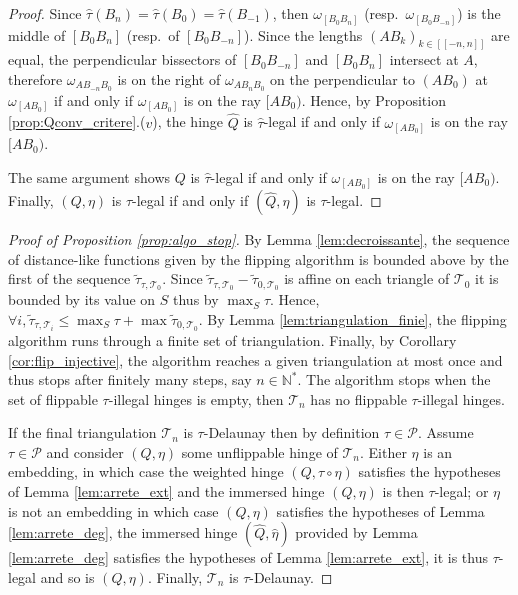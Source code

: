 \documentclass[a4paper,12pt]{article}
\def\NN{\mathbb N}
\def\lsem{[\![}
\def\rsem{]\!]}
\def\TT{\mathcal T}
\def\adm{\P}
\def\adm{\mathcal{P}}
\def\P{\mathcal{P}}
\newcommand{\tautilde}[2]{\widetilde\tau_{#1,#2}}
\theoremstyle{definition}
\begin{document}
\begin{proof}
						Since $\hat\tau(B_n)=\hat\tau(B_0)=\hat\tau(B_{-1})$, then $\omega_{[B_0B_n]}$ (resp.\ $\omega_{[B_0B_{-n}]}$) is the middle of $[B_0B_n]$ (resp.\ of $[B_0B_{-n}]$). Since the lengths $(AB_k)_{k\in \lsem -n,n\rsem}$ are equal, the perpendicular bissectors of $[B_0B_{-n}]$ and $[B_0B_{n}]$ intersect at $A$, therefore $\omega_{AB_{-n}B_0}$ is on the right of $\omega_{AB_{n}B_0}$ on the perpendicular to $(AB_0)$ at $\omega_{[AB_0]}$ if and only if $\omega_{[AB_0]}$
						 is on the ray $[AB_0)$. Hence, by Proposition \ref{prop:Qconv_critere}.($v$), the hinge $\hat Q$ is $\hat\tau$-legal if and only if $\omega_{[AB_0]}$ is on the ray $[AB_0)$.
						
						The same argument shows $Q$ is $\hat\tau$-legal if and only if $\omega_{[AB_0]}$ is on the ray $[AB_0)$. Finally, 
						$(Q,\eta)$ is $\tau$-legal if and only if $(\hat Q,\hat \eta)$ is $\tau$-legal.\end{proof}
						\begin{proof}[Proof of Proposition \ref{prop:algo_stop}]
							By Lemma \ref{lem:decroissante}, the sequence of distance-like functions given by the flipping algorithm is bounded above by the first of the sequence $\tautilde{\tau}{\TT_0}$. Since $\tautilde{\tau}{\TT_0}-\tautilde{0}{\TT_0}$ is affine on each triangle of $\TT_0$ it is bounded by its value on $S$ thus by $\max_S \tau$. 
							Hence, $\forall i,\tautilde{\tau}{\TT_i}\leq \max_S{\tau}+\max\tautilde{0}{\TT_0}$.
							By Lemma \ref{lem:triangulation_finie}, the flipping algorithm runs through a finite set of triangulation. Finally, by Corollary \ref{cor:flip_injective}, the algorithm reaches a given triangulation at most once and thus stops after finitely many steps, say $n\in \NN^*$. The algorithm stops when the set of flippable $\tau$-illegal hinges is empty, then $\TT_n$ has no flippable $\tau$-illegal hinges.
							
							If the final triangulation $\TT_n$ is $\tau$-Delaunay then by definition $\tau\in \adm$. Assume $\tau \in \adm$ and consider $(Q,\eta)$ some unflippable hinge of $\TT_n$. Either $\eta$ is an embedding, in which case the weighted hinge $(Q,\tau\circ \eta)$ satisfies the hypotheses of Lemma \ref{lem:arrete_ext} and the immersed hinge $(Q,\eta)$ is then $\tau$-legal; or $\eta$ is not an embedding in which case $(Q,\eta)$ satisfies the hypotheses of Lemma \ref{lem:arrete_deg}, the immersed hinge $(\hat Q,\hat \eta)$ provided by Lemma \ref{lem:arrete_deg} satisfies the hypotheses of Lemma \ref{lem:arrete_ext}, it is thus $\tau$-legal and so is $(Q,\eta)$. Finally, $\TT_n$ is $\tau$-Delaunay.
						\end{proof}
						
\end{document}
